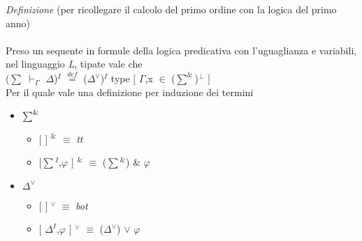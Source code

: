\noindent \textit{Definizione} (per ricollegare il calcolo del primo ordine con la logica del primo anno)\\\\
\noindent 
Preso un sequente in formule della logica predicativa con l'uguaglianza  e variabili, nel linguaggio \textit{L}, tipate vale che\\
({\scriptsize $\sum$} $\vdash_\Gamma$ $\Delta$)$^I$ ${\overset{\mathit{def}}{=}}$ ($\Delta^\vee$)$^I$ type $[$ $\Gamma$,x $\in$ ($\sum^\&$)$^\bot$ $]$\\
Per il quale vale una definizione per induzione dei termini
\begin{itemize}
\item ${\scriptsize\sum}^\&$
\begin{itemize}
\item $[$ $]$ $^\&$ $\equiv$ \textit{tt}
\item $[${\scriptsize$\sum$}$^I$,$\varphi$ $]$ $^\&$ $\equiv$ ({\scriptsize$\sum$}$^\&$) \& $\varphi$
\end{itemize}
\item $\Delta^\vee$
\begin{itemize}
\item $[$ $]$ $^\vee$ $\equiv$ \textit{bot}
\item $[$ $\Delta^I$,$\varphi$ $]$ $^\vee$ $\equiv$ ($\Delta^\vee$) $\vee$ $\varphi$
\end{itemize}

\end{itemize}

